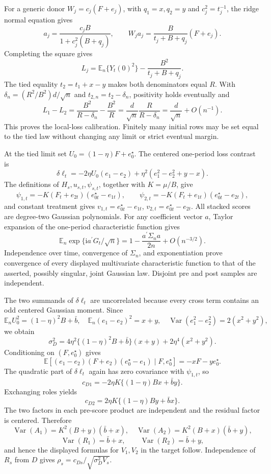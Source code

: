 For a generic donor \(W_j=c_j(F+e_j)\), with \(q_1=x,q_2=y\) and \(c_j^2=t_j^{-1}\), the ridge normal equation gives
\[
 a_j=\frac{c_jB}{1+c_j^2(B+q_j)},
 \qquad
 W_ja_j=\frac{B}{t_j+B+q_j}(F+e_j).
\]
Completing the square gives
\[
 L_j=\mathbb E_n\{Y_t(0)^2\}-\frac{B^2}{t_j+B+q_j}.
\]
The tied equality \(t_2=t_1+x-y\) makes both denominators equal \(R\).  With \(\delta_n=(R^2/B^2)d/\sqrt n\) and \(t_{2,n}=t_2-\delta_n\), positivity holds eventually and
\[
 L_1-L_2=\frac{B^2}{R-\delta_n}-\frac{B^2}{R}
 =\frac d{\sqrt n}\frac{R}{R-\delta_n}
 =\frac d{\sqrt n}+O(n^{-1}).
\]
This proves the local-loss calibration.  Finitely many initial rows may be set equal to the tied law without changing any limit or strict eventual margin.

At the tied limit set \(U_0=(1-\eta)F+e_0^{\star}\).  The centered one-period loss contrast is
\[
 \delta\ell_t=-2\eta U_0(e_1-e_2)+\eta^2(e_1^2-e_2^2+y-x).
\]
The definitions of \(H_s,u_{s,t},\psi_{s,t}\), together with \(K=\mu/B\), give
\[
 \psi_{1,t}=-K(F_t+e_{2t})(e_{0t}^{\star}-e_{1t}),
 \qquad
 \psi_{2,t}=-K(F_t+e_{1t})(e_{0t}^{\star}-e_{2t}),
\]
and constant treatment gives \(v_{1,t}=e_{0t}^{\star}-e_{1t}\), \(v_{2,t}=e_{0t}^{\star}-e_{2t}\).  All stacked scores are degree-two Gaussian polynomials.  For any coefficient vector \(a\), Taylor expansion of the one-period characteristic function gives
\[
 \mathbb E_n\exp\{\mathrm ia^{\prime}G_t/\sqrt n\}
 =1-\frac{a^{\prime}\Sigma_na}{2n}+O(n^{-3/2}).
\]
Independence over time, convergence of \(\Sigma_n\), and exponentiation prove convergence of every displayed multivariate characteristic function to that of the asserted, possibly singular, joint Gaussian law.  Disjoint pre and post samples are independent.

The two summands of \(\delta\ell_t\) are uncorrelated because every cross term contains an odd centered Gaussian moment.  Since
\[
 \mathbb E_nU_0^2=(1-\eta)^2B+\bar b,\quad
 \mathbb E_n(e_1-e_2)^2=x+y,\quad
 \operatorname{Var}(e_1^2-e_2^2)=2(x^2+y^2),
\]
we obtain
\[
 \sigma_D^2=4\eta^2\{(1-\eta)^2B+\bar b\}(x+y)
 +2\eta^4(x^2+y^2).
\]
Conditioning on \((F,e_0^{\star})\) gives
\[
 \mathbb E[(e_1-e_2)(F+e_2)(e_0^{\star}-e_1)\mid F,e_0^{\star}]
 =-xF-ye_0^{\star}.
\]
The quadratic part of \(\delta\ell_t\) again has zero covariance with \(\psi_{1,t}\), so
\[
 c_{D1}=-2\eta K\{(1-\eta)Bx+\bar b y\}.
\]
Exchanging roles yields
\[
 c_{D2}=2\eta K\{(1-\eta)By+\bar b x\}.
\]
The two factors in each pre-score product are independent and the residual factor is centered.  Therefore
\[
 \operatorname{Var}(A_1)=K^2(B+y)(\bar b+x),
 \quad \operatorname{Var}(A_2)=K^2(B+x)(\bar b+y),
\]
\[
 \operatorname{Var}(R_1)=\bar b+x,\qquad
 \operatorname{Var}(R_2)=\bar b+y,
\]
and hence the displayed formulas for \(V_1,V_2\) in the target follow.  Independence of \(R_s\) from \(D\) gives \(\rho_s=c_{Ds}/\sqrt{\sigma_D^2V_s}\).

